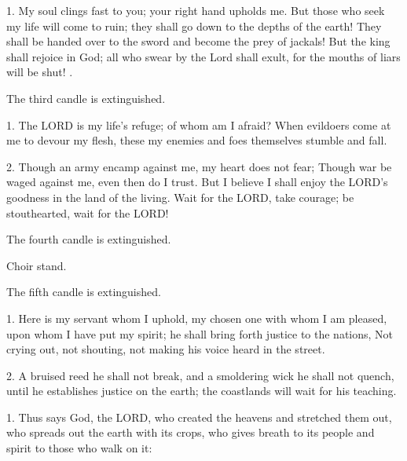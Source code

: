 1. My soul clings fast to you; your right hand upholds me. But those who seek
my life will come to ruin; they shall go down to the depths of the earth! They
shall be handed over to the sword and become the prey of jackals! But the king
shall rejoice in God; all who swear by the Lord shall exult, for the mouths of
liars will be shut! \RBar.

\begin{rubric}
  The third candle is extinguished.
\end{rubric}




1. The LORD is my life's refuge; of whom am I afraid? When evildoers come at me
to devour my flesh, these my enemies and foes themselves stumble and fall.

2. Though an army encamp against me, my heart does not fear; Though war be
waged against me, even then do I trust. But I believe I shall enjoy the LORD's
goodness in the land of the living. Wait for the LORD, take courage; be
stouthearted, wait for the LORD!

\begin{rubric}
  The fourth candle is extinguished.
\end{rubric}


\begin{rubric}
  Choir stand.
\end{rubric}



\begin{rubric}
  The fifth candle is extinguished.
\end{rubric}


1. Here is my servant whom I uphold, my chosen one with whom I am pleased, upon
whom I have put my spirit; he shall bring forth justice to the nations, Not
crying out, not shouting, not making his voice heard in the street.

2. A bruised reed he shall not break, and a smoldering wick he shall not
quench, until he establishes justice on the earth; the coastlands will wait for
his teaching.

1. Thus says God, the LORD, who created the heavens and stretched them out, who
spreads out the earth with its crops, who gives breath to its people and
spirit to those who walk on it:

